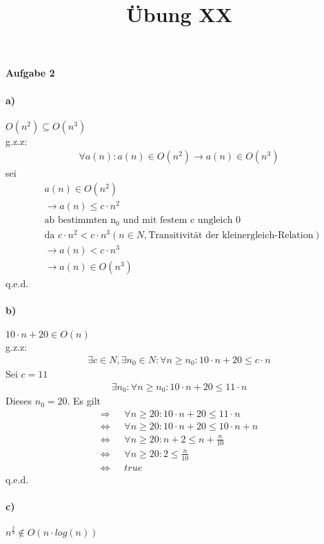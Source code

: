 \documentclass[a4paper,11pt]{scrartcl}
\title{Übung XX}
\begin{document}
\begin{center}
\LARGE{\textbf{Aufgabe 2}}
\end{center}
\paragraph{a)}$O(n^2)\subseteq O(n^3)$\\
g.z.z:
\begin{align*}
\forall a(n): a(n)\in O(n^2) \rightarrow a(n)\in O(n^3)
\end{align*}
sei 
\begin{align*}
&a(n)\in O(n^2)\\ &\rightarrow a(n)\leq c\cdot n^2 \\&\text{ab bestimmten n$_0$ und mit festem c ungleich 0}\\ &\text{da } c\cdot n^2 < c\cdot n^3 (n\in N, \text{Transitivität der kleinergleich-Relation})
\\ &\rightarrow a(n)<c\cdot n^3
\\ &\rightarrow a(n)\in O(n^3)
\end{align*}
q.e.d.
\paragraph{b)}$10\cdot n + 20 \in O(n)$ \\ g.z.z:
\begin{align*}
\exists c\in N, \exists n_0\in N: \forall n\geq n_0: 10\cdot n + 20 \leq c\cdot n
\end{align*}
Sei $c=11$
\begin{align*}
\exists n_0: \forall n\geq n_0: 10\cdot n +20 \leq 11\cdot n
\end{align*}
Dieses $n_0 = 20$. Es gilt
\begin{align*}
\Rightarrow\mbox{ }&\forall n\geq 20: 10\cdot n +20 \leq 11\cdot n\\
\Leftrightarrow\mbox{ }&\forall n\geq 20: 10\cdot n +20 \leq 10\cdot n + n\\
\Leftrightarrow\mbox{ }&\forall n\geq 20: n +2 \leq n + \frac{n}{10}\\
\Leftrightarrow\mbox{ }&\forall n\geq 20: 2 \leq \frac{n}{10}\\
\Leftrightarrow\mbox{ }&true
\end{align*}
q.e.d.
\paragraph{c)} $n^{\frac{2}{3}}\notin O(n\cdot log(n))$
\end{document}

